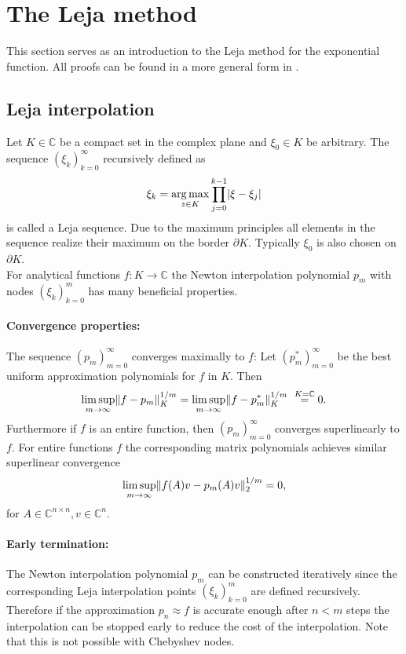 \documentclass{scrartcl}
\begin{document}
\section{The Leja method}
This section serves as an introduction to the Leja method for the exponential function. All proofs can be found in a more general form in \cite{advdif}. 

\subsection{Leja interpolation}
Let $K\in\mathbb{C}$ be a compact set in the complex plane and $\xi_0\in K$ be arbitrary. The sequence $(\xi_k)_{k=0}^{\infty}$ recursively defined as
\[\xi_k = \underset{{z\in K}}{\operatorname{arg\,max}}\displaystyle\prod_{j=0}^{k-1}\lvert\xi-\xi_j\rvert\]
is called a Leja sequence. Due to the maximum principles all elements in the sequence realize their maximum on the border $\partial K$. Typically $\xi_0$ is also chosen on $\partial K$.\\
For analytical functions $f\!:K\to\mathbb{C}$ the Newton interpolation polynomial $p_m$ with nodes $(\xi_k)_{k=0}^{m}$ has many beneficial properties. 
\paragraph{Convergence properties:}
The sequence $(p_m)_{m=0}^\infty$ converges maximally to $f$: Let $(p_m^{*})_{m=0}^\infty$ be the best uniform approximation polynomials for $f$ in $K$. Then
\[\limsup\limits_{m \rightarrow \infty}\lVert f-p_m\rVert_{K}^{1/m} = \limsup\limits_{m \rightarrow \infty}\lVert f-p_m^{*}\rVert_{K}^{1/m} \ \overset{{K=\mathbb{C}}}{=} 0. \]
Furthermore if $f$ is an entire function, then $(p_m)_{m=0}^\infty$ converges superlinearly to $f$. For entire functions $f$ the corresponding matrix polynomials achieves similar superlinear convergence
\[\limsup\limits_{m \rightarrow \infty}\lVert f(A)v-p_m(A)v\rVert_{2}^{1/m} = 0, \]
for $A\in\mathbb{C}^{n\times n}, v\in\mathbb{C}^n$.

\paragraph{Early termination:}
The Newton interpolation polynomial $p_m$ can be constructed iteratively since the corresponding Leja interpolation points $(\xi_k)_{k=0}^{m}$ are defined recursively. Therefore if the approximation $p_n \approx f$ is accurate enough after $n<m$ steps the interpolation can be stopped early to reduce the cost of the interpolation. Note that this is not possible with Chebyshev nodes.
\end{document}
